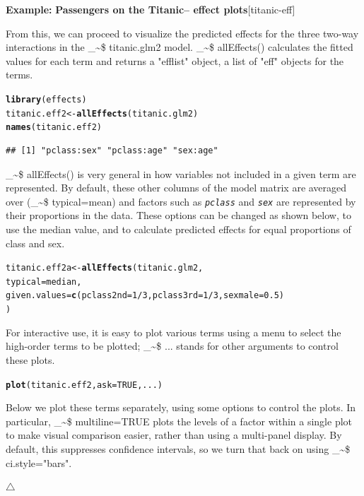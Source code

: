 \documentclass{article}
\makeatletter
\newcommand{\hlnum}[1]{\textcolor[rgb]{0.686,0.059,0.569}{#1}}%
\newcommand{\hlopt}[1]{\textcolor[rgb]{0,0,0}{#1}}%
\newcommand{\hlstd}[1]{\textcolor[rgb]{0.345,0.345,0.345}{#1}}%
\newcommand{\hlkwb}[1]{\textcolor[rgb]{0.69,0.353,0.396}{#1}}%
\newcommand{\hlkwc}[1]{\textcolor[rgb]{0.333,0.667,0.333}{#1}}%
\newcommand{\hlkwd}[1]{\textcolor[rgb]{0.737,0.353,0.396}{\textbf{#1}}}%
\newenvironment{kframe}{%
 \def\at@end@of@kframe{}%
 \ifinner\ifhmode%
  \def\at@end@of@kframe{\end{minipage}}%
  \begin{minipage}{\columnwidth}%
 \fi\fi%
 \def\FrameCommand##1{\hskip\@totalleftmargin \hskip-\fboxsep
 \colorbox{shadecolor}{##1}\hskip-\fboxsep
     \hskip-\linewidth \hskip-\@totalleftmargin \hskip\columnwidth}%
 \MakeFramed {\advance\hsize-\width
   \@totalleftmargin\z@ \linewidth\hsize
   \@setminipage}}%
 {\par\unskip\endMakeFramed%
 \at@end@of@kframe}
\newenvironment{knitrout}{}{} %
\newcommand{\var}[1]{\textit{\texttt{#1}}}
\newcommand{\class}[1]{\textsf{"#1"}}
\newcommand\code{\bgroup\@makeother\_\@makeother\~\@makeother\$\@codex}
\def\@codex#1{{\normalfont\ttfamily\hyphenchar\font=-1 #1}\egroup}
\newcommand{\func}[1]{\code{#1()}}
\newenvironment{Example}[2][unnamed-example]%
  {\medskip\noindent\textbf{\textsf{Example:}}
   \textbf{#2}\hfill [#1]\par\smallskip
  }
  {\hfill $\triangle$}
\makeatother
\begin{document}
\begin{Example}[titanic-eff]{Passengers on the Titanic-- effect plots}
From this, we can proceed to visualize the predicted effects for the three two-way interactions 
in the \code{titanic.glm2} model.  \func{allEffects} calculates the fitted values for each
term and returns a \class{efflist} object, a list of \class{eff} objects for the terms.
\begin{knitrout}
\color{fgcolor}\begin{kframe}
\begin{alltt}
\hlkwd{library}\hlstd{(effects)}
\hlstd{titanic.eff2} \hlkwb{<-} \hlkwd{allEffects}\hlstd{(titanic.glm2)}
\hlkwd{names}\hlstd{(titanic.eff2)}
\end{alltt}
\begin{verbatim}
## [1] "pclass:sex" "pclass:age" "sex:age"
\end{verbatim}
\end{kframe}
\end{knitrout}
\func{allEffects} is very general in how variables not included in a given term
are represented.  By default, these other columns of the model matrix
are averaged over (\code{typical=mean}) and factors such as \var{pclass} and
\var{sex} are represented by their proportions in the data.  These options
can be changed as shown below, to use the median value, and to calculate predicted
effects for equal proportions of class and sex.

\begin{knitrout}
\color{fgcolor}\begin{kframe}
\begin{alltt}
\hlstd{titanic.eff2a} \hlkwb{<-} \hlkwd{allEffects}\hlstd{(titanic.glm2,}
  \hlkwc{typical}\hlstd{=median,}
  \hlkwc{given.values}\hlstd{=}\hlkwd{c}\hlstd{(}\hlkwc{pclass2nd}\hlstd{=}\hlnum{1}\hlopt{/}\hlnum{3}\hlstd{,} \hlkwc{pclass3rd}\hlstd{=}\hlnum{1}\hlopt{/}\hlnum{3}\hlstd{,} \hlkwc{sexmale}\hlstd{=}\hlnum{0.5}\hlstd{)}
        \hlstd{)}
\end{alltt}
\end{kframe}
\end{knitrout}

For interactive use, it is easy to plot various terms using a menu to select
the high-order terms to be plotted; \code{...} stands for other arguments
to control these plots.
\begin{knitrout}
\color{fgcolor}\begin{kframe}
\begin{alltt}
\hlkwd{plot}\hlstd{(titanic.eff2,} \hlkwc{ask}\hlstd{=}\hlnum{TRUE}\hlstd{, ...)}
\end{alltt}
\end{kframe}
\end{knitrout}
Below we plot these terms separately, using some options to control the plots.
In particular, \code{multiline=TRUE} plots the levels of a factor within a
single plot to make visual comparison easier, rather than using a multi-panel display.
By default, this suppresses confidence intervals, so we turn that back on
using \code{ci.style="bars"}.


\end{Example}
\end{document}
